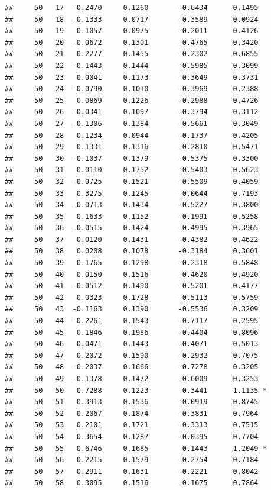 \documentclass[
]{article}
\begin{document}
\begin{verbatim}
##     50   17  -0.2470     0.1260       -0.6434      0.1495  
##     50   18  -0.1333     0.0717       -0.3589      0.0924  
##     50   19   0.1057     0.0975       -0.2011      0.4126  
##     50   20  -0.0672     0.1301       -0.4765      0.3420  
##     50   21   0.2277     0.1455       -0.2302      0.6855  
##     50   22  -0.1443     0.1444       -0.5985      0.3099  
##     50   23   0.0041     0.1173       -0.3649      0.3731  
##     50   24  -0.0790     0.1010       -0.3969      0.2388  
##     50   25   0.0869     0.1226       -0.2988      0.4726  
##     50   26  -0.0341     0.1097       -0.3794      0.3112  
##     50   27  -0.1306     0.1384       -0.5661      0.3049  
##     50   28   0.1234     0.0944       -0.1737      0.4205  
##     50   29   0.1331     0.1316       -0.2810      0.5471  
##     50   30  -0.1037     0.1379       -0.5375      0.3300  
##     50   31   0.0110     0.1752       -0.5403      0.5623  
##     50   32  -0.0725     0.1521       -0.5509      0.4059  
##     50   33   0.3275     0.1245       -0.0644      0.7193  
##     50   34  -0.0713     0.1434       -0.5227      0.3800  
##     50   35   0.1633     0.1152       -0.1991      0.5258  
##     50   36  -0.0515     0.1424       -0.4995      0.3965  
##     50   37   0.0120     0.1431       -0.4382      0.4622  
##     50   38   0.0208     0.1078       -0.3184      0.3601  
##     50   39   0.1765     0.1298       -0.2318      0.5848  
##     50   40   0.0150     0.1516       -0.4620      0.4920  
##     50   41  -0.0512     0.1490       -0.5201      0.4177  
##     50   42   0.0323     0.1728       -0.5113      0.5759  
##     50   43  -0.1163     0.1390       -0.5536      0.3209  
##     50   44  -0.2261     0.1543       -0.7117      0.2595  
##     50   45   0.1846     0.1986       -0.4404      0.8096  
##     50   46   0.0471     0.1443       -0.4071      0.5013  
##     50   47   0.2072     0.1590       -0.2932      0.7075  
##     50   48  -0.2037     0.1666       -0.7278      0.3205  
##     50   49  -0.1378     0.1472       -0.6009      0.3253  
##     50   50   0.7288     0.1223        0.3441      1.1135 *
##     50   51   0.3913     0.1536       -0.0919      0.8745  
##     50   52   0.2067     0.1874       -0.3831      0.7964  
##     50   53   0.2101     0.1721       -0.3313      0.7515  
##     50   54   0.3654     0.1287       -0.0395      0.7704  
##     50   55   0.6746     0.1685        0.1443      1.2049 *
##     50   56   0.2215     0.1579       -0.2754      0.7184  
##     50   57   0.2911     0.1631       -0.2221      0.8042  
##     50   58   0.3095     0.1516       -0.1675      0.7864  

\end{verbatim}
\end{document}
